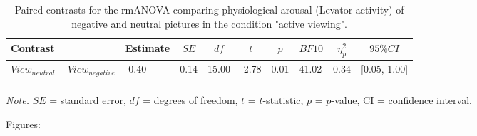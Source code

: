 \documentclass[
  english,
  man,floatsintext]{apa6}
\begin{document}
\begin{table}[H]

\begin{center}
\begin{threeparttable}

\caption{\label{tab:unnamed-chunk-6}Paired contrasts for the rmANOVA comparing physiological arousal (Levator activity) of negative and neutral pictures in the condition "active viewing".}

\begin{tabular}{lllllllll}
\toprule
Contrast & \multicolumn{1}{c}{Estimate} & \multicolumn{1}{c}{$SE$} & \multicolumn{1}{c}{$df$} & \multicolumn{1}{c}{$t$} & \multicolumn{1}{c}{$p$} & \multicolumn{1}{c}{$BF10$} & \multicolumn{1}{c}{$\eta_{p}^{2}$} & \multicolumn{1}{c}{$95\% CI$}\\
\midrule
$View_{neutral} - View_{negative}$ & -0.40 & 0.14 & 15.00 & -2.78 & 0.01 & 41.02 & 0.34 & {}[0.05, 1.00]\\
\bottomrule
\addlinespace
\end{tabular}

\begin{tablenotes}[para]
\normalsize{\textit{Note.} $SE$ = standard error, $df$ = degrees of freedom, $t$ = $t$-statistic, $p$ = $p$-value, CI = confidence interval.}
\end{tablenotes}

\end{threeparttable}
\end{center}

\end{table}

Figures:
\end{document}
